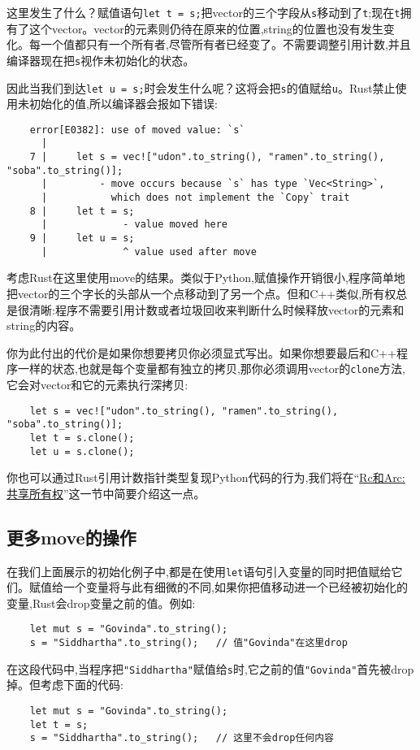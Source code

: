 这里发生了什么？赋值语句\texttt{let t = s;}把vector的三个字段从\texttt{s}移动到了\texttt{t};现在\texttt{t}拥有了这个vector。vector的元素则仍待在原来的位置,string的位置也没有发生变化。每一个值都只有一个所有者,尽管所有者已经变了。不需要调整引用计数,并且编译器现在把\texttt{s}视作未初始化的状态。

因此当我们到达\texttt{let u = s;}时会发生什么呢？这将会把\texttt{s}的值赋给\texttt{u}。Rust禁止使用未初始化的值,所以编译器会报如下错误:
\begin{verbatim}
    error[E0382]: use of moved value: `s`
      |
    7 |     let s = vec!["udon".to_string(), "ramen".to_string(), "soba".to_string()];
      |         - move occurs because `s` has type `Vec<String>`,
      |           which does not implement the `Copy` trait
    8 |     let t = s;
      |             - value moved here
    9 |     let u = s;
      |             ^ value used after move
\end{verbatim}

考虑Rust在这里使用move的结果。类似于Python,赋值操作开销很小,程序简单地把vector的三个字长的头部从一个点移动到了另一个点。但和C++类似,所有权总是很清晰:程序不需要引用计数或者垃圾回收来判断什么时候释放vector的元素和string的内容。

你为此付出的代价是如果你想要拷贝你必须显式写出。如果你想要最后和C++程序一样的状态,也就是每个变量都有独立的拷贝,那你必须调用vector的\texttt{clone}方法,它会对vector和它的元素执行深拷贝:
\begin{verbatim}
    let s = vec!["udon".to_string(), "ramen".to_string(), "soba".to_string()];
    let t = s.clone();
    let u = s.clone();
\end{verbatim}

你也可以通过Rust引用计数指针类型复现Python代码的行为,我们将在“\hyperref[rc]{Rc和Arc:共享所有权}”这一节中简要介绍这一点。

\subsection{更多move的操作}

在我们上面展示的初始化例子中,都是在使用\texttt{let}语句引入变量的同时把值赋给它们。赋值给一个变量将与此有细微的不同,如果你把值移动进一个已经被初始化的变量,Rust会drop变量之前的值。例如:
\begin{verbatim}
    let mut s = "Govinda".to_string();
    s = "Siddhartha".to_string();   // 值"Govinda"在这里drop
\end{verbatim}

在这段代码中,当程序把\texttt{"Siddhartha"}赋值给\texttt{s}时,它之前的值\texttt{"Govinda"}首先被drop掉。但考虑下面的代码:
\begin{verbatim}
    let mut s = "Govinda".to_string();
    let t = s;
    s = "Siddhartha".to_string();   // 这里不会drop任何内容
\end{verbatim}


